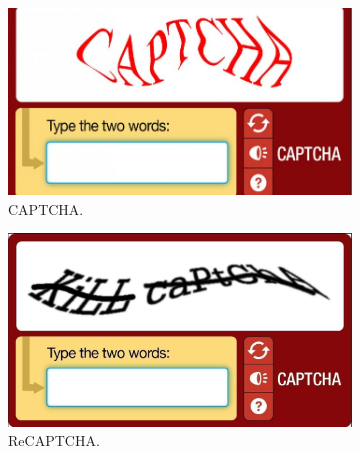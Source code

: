 \begin{figure}[h!t]
    \centering
    \begin{subfigure}{0.49\textwidth}
        \centering
        \includegraphics[scale=0.2]{assets/images/captcha.jpg}
        \caption{CAPTCHA.}
        \label{fig:captcha:catpcha}
    \end{subfigure}
    \begin{subfigure}{0.49\textwidth}
        \centering
        \includegraphics[scale=0.23]{assets/images/recaptcha.jpg}
        \caption{ReCAPTCHA.}
        \label{fig:captcha:recatpcha}
    \end{subfigure}
    \begin{subfigure}{0.49\textwidth}
        \centering

\end{subfigure}
\end{figure}
